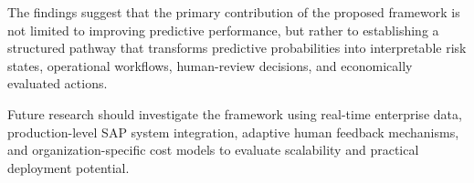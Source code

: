 \documentclass[11pt,a4paper]{article}
\begin{document}
The findings suggest that the primary contribution of the proposed framework is not limited to improving predictive performance, but rather to establishing a structured pathway that transforms predictive probabilities into interpretable risk states, operational workflows, human-review decisions, and economically evaluated actions.

Future research should investigate the framework using real-time enterprise data, production-level SAP system integration, adaptive human feedback mechanisms, and organization-specific cost models to evaluate scalability and practical deployment potential.



\end{document}
